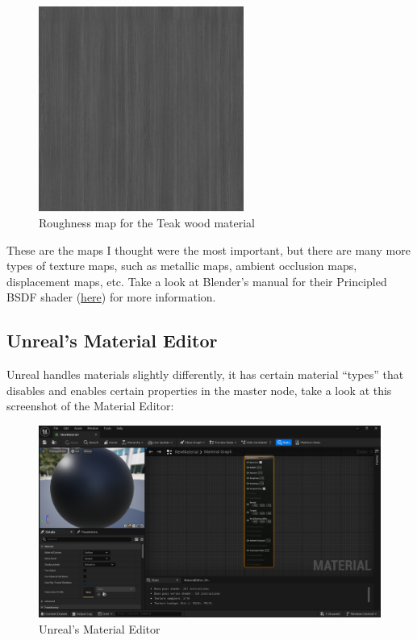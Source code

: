 \documentclass{article}
\begin{document}
\begin{figure}[!h]
    \centering
    \includegraphics[width=0.6\textwidth]{day2images/Teak_4k_Roughness.jpg}
    \caption{Roughness map for the Teak wood material}
    \label{fig:roughness_map}
\end{figure}

\newpage

These are the maps I thought were the most important, but there are many more types of texture maps, such as metallic maps, ambient occlusion maps, displacement maps, etc. Take a look at Blender's manual for their Principled BSDF shader (\href{https://docs.blender.org/manual/en/4.0/render/shader_nodes/shader/principled.html#bpy-types-shadernodebsdfprincipled}{here}) for more information.

\subsection{Unreal's Material Editor}
Unreal handles materials slightly differently, it has certain material ``types'' that disables and enables certain properties in the master node, take a look at this screenshot of the Material Editor:

\begin{figure}[h]
    \centering
    \includegraphics[width=1\textwidth]{day2images/image001.png}
    \caption{Unreal's Material Editor}
    \label{fig:unreal_material_editor}
\end{figure}
\end{document}
